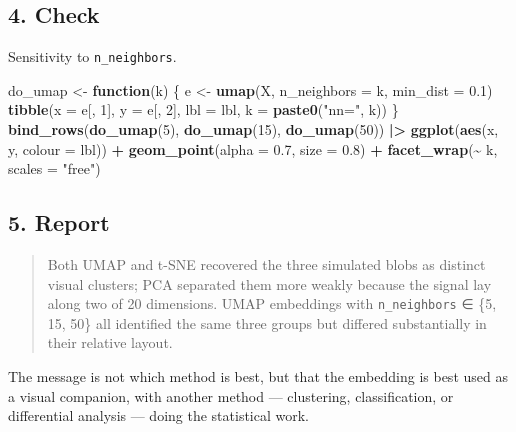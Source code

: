 \documentclass[
]{article}
\newenvironment{Shaded}{\begin{snugshade}}{\end{snugshade}}
\newcommand{\AttributeTok}[1]{\textcolor[rgb]{0.13,0.29,0.53}{#1}}
\newcommand{\ControlFlowTok}[1]{\textcolor[rgb]{0.13,0.29,0.53}{\textbf{#1}}}
\newcommand{\DecValTok}[1]{\textcolor[rgb]{0.00,0.00,0.81}{#1}}
\newcommand{\FloatTok}[1]{\textcolor[rgb]{0.00,0.00,0.81}{#1}}
\newcommand{\FunctionTok}[1]{\textcolor[rgb]{0.13,0.29,0.53}{\textbf{#1}}}
\newcommand{\NormalTok}[1]{#1}
\newcommand{\OtherTok}[1]{\textcolor[rgb]{0.56,0.35,0.01}{#1}}
\newcommand{\SpecialCharTok}[1]{\textcolor[rgb]{0.81,0.36,0.00}{\textbf{#1}}}
\newcommand{\StringTok}[1]{\textcolor[rgb]{0.31,0.60,0.02}{#1}}
\begin{document}
\subsection{4. Check}\label{check}

Sensitivity to \texttt{n\_neighbors}.

\begin{Shaded}
\begin{Highlighting}[]
\NormalTok{do\_umap }\OtherTok{\textless{}{-}} \ControlFlowTok{function}\NormalTok{(k) \{}
\NormalTok{  e }\OtherTok{\textless{}{-}} \FunctionTok{umap}\NormalTok{(X, }\AttributeTok{n\_neighbors =}\NormalTok{ k, }\AttributeTok{min\_dist =} \FloatTok{0.1}\NormalTok{)}
  \FunctionTok{tibble}\NormalTok{(}\AttributeTok{x =}\NormalTok{ e[, }\DecValTok{1}\NormalTok{], }\AttributeTok{y =}\NormalTok{ e[, }\DecValTok{2}\NormalTok{], }\AttributeTok{lbl =}\NormalTok{ lbl, }\AttributeTok{k =} \FunctionTok{paste0}\NormalTok{(}\StringTok{"nn="}\NormalTok{, k))}
\NormalTok{\}}
\FunctionTok{bind\_rows}\NormalTok{(}\FunctionTok{do\_umap}\NormalTok{(}\DecValTok{5}\NormalTok{), }\FunctionTok{do\_umap}\NormalTok{(}\DecValTok{15}\NormalTok{), }\FunctionTok{do\_umap}\NormalTok{(}\DecValTok{50}\NormalTok{)) }\SpecialCharTok{|\textgreater{}}
  \FunctionTok{ggplot}\NormalTok{(}\FunctionTok{aes}\NormalTok{(x, y, }\AttributeTok{colour =}\NormalTok{ lbl)) }\SpecialCharTok{+} \FunctionTok{geom\_point}\NormalTok{(}\AttributeTok{alpha =} \FloatTok{0.7}\NormalTok{, }\AttributeTok{size =} \FloatTok{0.8}\NormalTok{) }\SpecialCharTok{+}
  \FunctionTok{facet\_wrap}\NormalTok{(}\SpecialCharTok{\textasciitilde{}}\NormalTok{ k, }\AttributeTok{scales =} \StringTok{"free"}\NormalTok{)}
\end{Highlighting}
\end{Shaded}

\subsection{5. Report}\label{report}

\begin{quote}
Both UMAP and t-SNE recovered the three simulated blobs as distinct
visual clusters; PCA separated them more weakly because the signal lay
along two of 20 dimensions. UMAP embeddings with \texttt{n\_neighbors} ∈
\{5, 15, 50\} all identified the same three groups but differed
substantially in their relative layout.
\end{quote}

The message is not which method is best, but that the embedding is best
used as a visual companion, with another method --- clustering,
classification, or differential analysis --- doing the statistical work.
\end{document}

